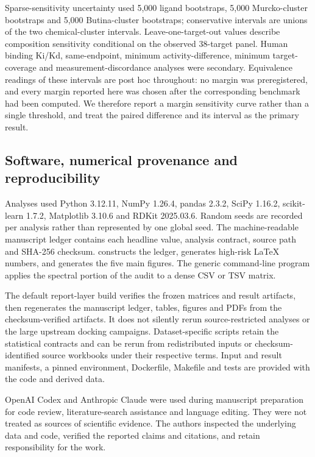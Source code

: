 \documentclass[11pt]{article}
\begin{document}
Sparse-sensitivity uncertainty used 5,000 ligand bootstraps, 5,000 Murcko-cluster bootstraps and 5,000
Butina-cluster bootstraps; conservative intervals are unions of the two chemical-cluster
intervals. Leave-one-target-out values describe composition sensitivity conditional on the
observed 38-target panel. Human binding Ki/Kd, same-endpoint, minimum activity-difference,
minimum target-coverage and measurement-discordance analyses were secondary. Equivalence readings of these
intervals are post hoc throughout: no margin was preregistered, and every margin reported
here was chosen after the corresponding benchmark had been computed. We therefore report a
margin sensitivity curve rather than a single threshold, and treat the paired difference and
its interval as the primary result.

\subsection{Software, numerical provenance and reproducibility}

Analyses used Python 3.12.11, NumPy 1.26.4, pandas 2.3.2, SciPy 1.16.2,
scikit-learn 1.7.2, Matplotlib 3.10.6 and RDKit 2025.03.6. Random seeds are recorded per
analysis rather than represented by one global seed. The machine-readable manuscript ledger
contains each headline value, analysis contract, source path and SHA-256 checksum.
 constructs the ledger,
 generates high-risk LaTeX numbers, and
 generates the five main figures. The generic
 command-line program applies the spectral portion of the
audit to a dense CSV or TSV matrix.

The default report-layer build verifies the frozen matrices and result artifacts, then
regenerates the manuscript ledger, tables, figures and PDFs from the checksum-verified
artifacts. It does not silently rerun source-restricted analyses or the large upstream
docking campaigns. Dataset-specific scripts retain the statistical contracts and can be
rerun from redistributed inputs or checksum-identified source workbooks under their
respective terms. Input and result manifests, a pinned environment, Dockerfile, Makefile
and tests are provided with the code and derived data.

OpenAI Codex and Anthropic Claude were used during manuscript preparation for code review,
literature-search assistance and language editing. They were not treated as sources of
scientific evidence. The authors inspected the underlying data and code, verified the
reported claims and citations, and retain responsibility for the work.
\end{document}
